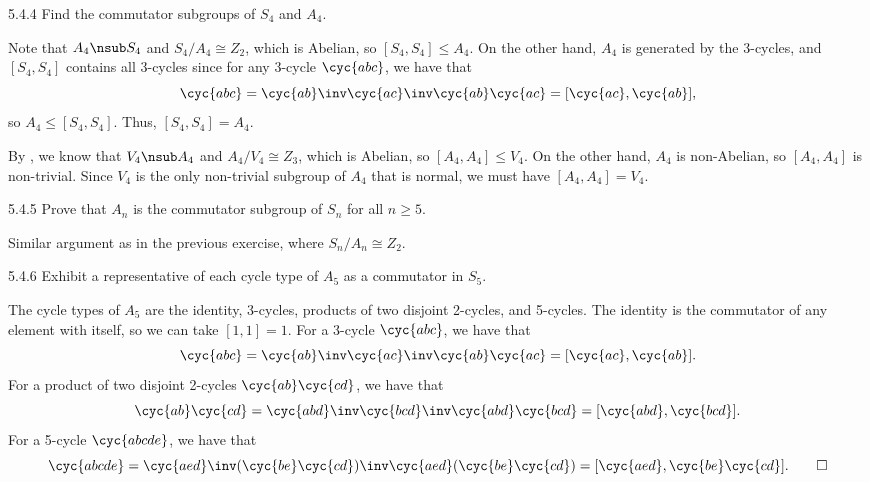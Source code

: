 \begin{exercise}{5.4.4}
    Find the commutator subgroups of $S_4$ and $A_4$.
\end{exercise}

\begin{sol}
    Note that $A_4 \nsub S_4$ and $S_4/A_4 \cong Z_2$, which is Abelian, so $[S_4, S_4] \leq A_4$.
	On the other hand, $A_4$ is generated by the 3-cycles, and $[S_4, S_4]$ contains all 3-cycles since for any 3-cycle $\cyc{a b c}$, we have that
    \[
    	\cyc{a b c} = \cyc{a b}\inv \cyc{a c}\inv \cyc{a b} \cyc{a c} = [\cyc{a c}, \cyc{a b}],
    \]
    so $A_4 \leq [S_4, S_4]$.
	Thus, $[S_4, S_4] = A_4$. 

    By , we know that $V_4 \nsub A_4$ and $A_4/V_4 \cong Z_3$, which is Abelian, so $[A_4, A_4] \leq V_4$.
	On the other hand, $A_4$ is non-Abelian, so $[A_4, A_4]$ is non-trivial.
	Since $V_4$ is the only non-trivial subgroup of $A_4$ that is normal, we must have $[A_4, A_4] = V_4$. \qedhere
\end{sol}

\begin{exercise}{5.4.5}
    Prove that $A_n$ is the commutator subgroup of $S_n$ for all $n \geq 5$.
\end{exercise}

\begin{sol}
    Similar argument as in the previous exercise, where $S_n/A_n \cong Z_2$.
\end{sol}

\begin{exercise}{5.4.6}
    Exhibit a representative of each cycle type of $A_5$ as a commutator in $S_5$.
\end{exercise}

\begin{sol}
    The cycle types of $A_5$ are the identity, 3-cycles, products of two disjoint 2-cycles, and 5-cycles.
	The identity is the commutator of any element with itself, so we can take $[1, 1] = 1$.
	For a 3-cycle $\cyc{a b c}$, we have that
    \[
    	\cyc{a b c} = \cyc{a b}\inv \cyc{a c}\inv \cyc{a b} \cyc{a c} = [\cyc{a c}, \cyc{a b}].
    \]
    For a product of two disjoint 2-cycles $\cyc{a b}\cyc{c d}$, we have that
    \[
    	\cyc{a b}\cyc{c d} = \cyc{a b d}\inv \cyc{b c d}\inv \cyc{a b d} \cyc{b c d} = [\cyc{a b d}, \cyc{b c d}].
    \]
    For a 5-cycle $\cyc{a b c d e}$, we have that
    \[
    	\cyc{a b c d e} = \cyc{a e d}\inv (\cyc{b e}\cyc{c d})\inv \cyc{a e d} (\cyc{b e}\cyc{c d}) = [\cyc{a e d}, \cyc{b e}\cyc{c d}]. \qedhere
    \]
\end{sol}

